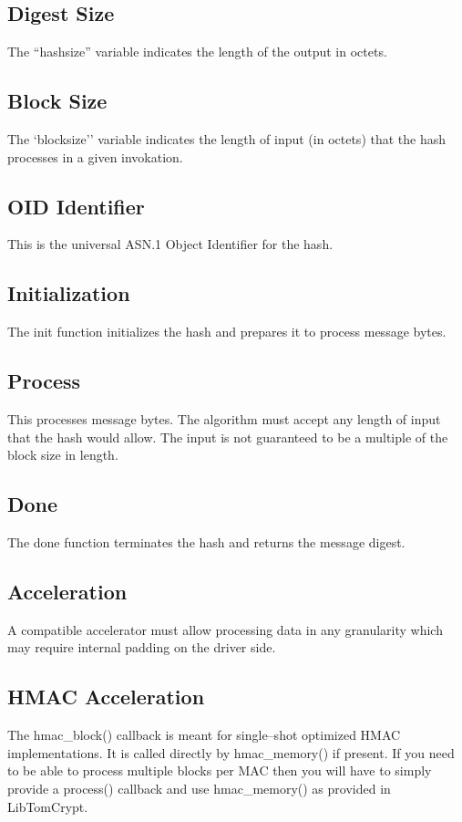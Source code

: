 \documentclass[a4paper]{book}
\begin{document}
\subsection{Digest Size}
The ``hashsize'' variable indicates the length of the output in octets.

\subsection{Block Size}
The `blocksize'' variable indicates the length of input (in octets) that the hash processes in a given
invokation.

\subsection{OID Identifier}
This is the universal ASN.1 Object Identifier for the hash.

\subsection{Initialization}
The init function initializes the hash and prepares it to process message bytes.

\subsection{Process}
This processes message bytes.  The algorithm must accept any length of input that the hash would allow.  The input is not
guaranteed to be a multiple of the block size in length.

\subsection{Done}
The done function terminates the hash and returns the message digest.

\subsection{Acceleration}
A compatible accelerator must allow processing data in any granularity which may require internal padding on the driver side.

\subsection{HMAC Acceleration}
The hmac\_block() callback is meant for single--shot optimized HMAC implementations.  It is called directly by hmac\_memory() if present.  If you need
to be able to process multiple blocks per MAC then you will have to simply provide a process() callback and use hmac\_memory() as provided in LibTomCrypt.
\end{document}
